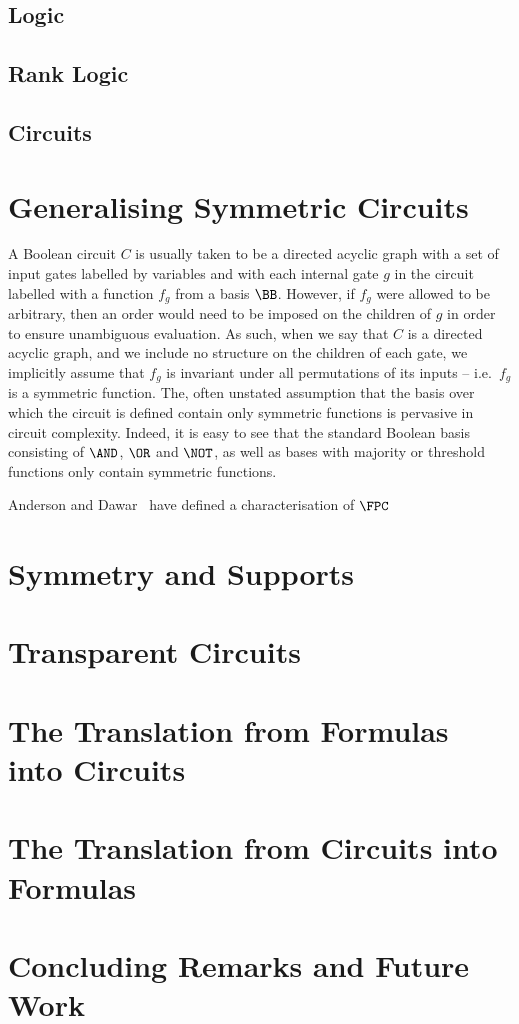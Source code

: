 \documentclass[a4paper,UKenglish]{lipics-v2018}
\begin{document}
\subsection{Logic}
\subsection{Rank Logic}
\subsection{Circuits}

\section{Generalising Symmetric Circuits}
A Boolean circuit $C$ is usually taken to be a directed acyclic graph with a set
of input gates labelled by variables and with each internal gate $g$ in the
circuit labelled with a function $f_g$ from a basis $\BB$. However, if $f_g$
were allowed to be arbitrary, then an order would need to be imposed on the
children of $g$ in order to ensure unambiguous evaluation. As such, when we say
that $C$ is a directed acyclic graph, and we include no structure on the
children of each gate, we implicitly assume that $f_g$ is invariant under all
permutations of its inputs -- i.e.\ $f_g$ is a symmetric function. The, often
unstated assumption that the basis over which the circuit is defined contain
only symmetric functions is pervasive in circuit complexity. Indeed, it is easy
to see that the standard Boolean basis consisting of $\AND$, $\OR$ and $\NOT$,
as well as bases with majority or threshold functions only contain symmetric
functions.

Anderson and Dawar~\cite{AndersonD17} have defined a characterisation of $\FPC$


\section{Symmetry and Supports}
\section{Transparent Circuits}
\section{The Translation from Formulas into Circuits}
\section{The Translation from Circuits into Formulas}
\section{Concluding Remarks and Future Work}



%
\end{document}
